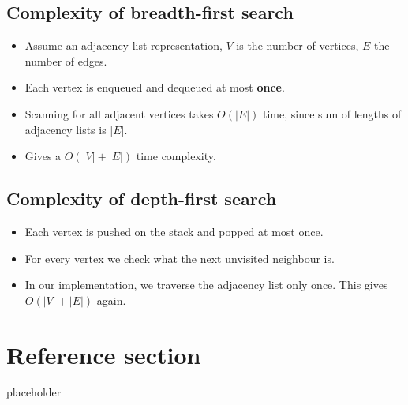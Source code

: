 \documentclass{article}
\begin{document}
\subsection{Complexity of breadth-first search}
\begin{itemize}
	\item Assume an adjacency list representation, $V$ is the number of vertices, $E$ the number of edges.
	\item Each vertex is enqueued and dequeued at most \textbf{once}. 
	\item Scanning for all adjacent vertices takes $O(|E|)$ time, since sum of lengths of adjacency lists is $|E|$.
	\item Gives a $O(|V|+|E|)$ time complexity.
\end{itemize}

\subsection{Complexity of depth-first search}
\begin{itemize}
	\item Each vertex is pushed on the stack and popped at most once.
	\item For every vertex we check what the next unvisited neighbour is.
	\item In our implementation, we traverse the adjacency list only once. This gives $O(|V|+|E|)$ again.
\end{itemize}

\pagebreak
\section*{Reference section} \label{sec:reference}
\begin{description}
	\item[placeholder] \hfill \\
\end{description}
\end{document}
